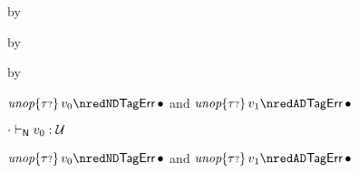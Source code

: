 {\begin{lamportproof*}
    \begin{pfproof}
      \absurdstep
        \begin{pfproof}
          by 
        \end{pfproof}
    \end{pfproof}

    \begin{pfproof}
      \absurdstep
        \begin{pfproof}
          by 
        \end{pfproof}
    \end{pfproof}

    \begin{pfproof}
      \absurdstep
        \begin{pfproof}
          by 
        \end{pfproof}
    \end{pfproof}

    \begin{pfproof}
      \qedstep
        \begin{pfproof}
          {$\eunopt{\stoptional}{\svalue_0} \nredND \tagerrorD$}
          and 
          {$\eunopt{\stoptional}{\svalue_1} \nredAD \tagerrorD$}
        \end{pfproof}
    \end{pfproof}

    \begin{pfproof}
      \absurdstep
        \begin{pfproof}
          ${\cdot} \vdash_{\mathsf{N}} v_0 : {\mathcal U}$
        \end{pfproof}
    \end{pfproof}

    \begin{pfproof}
      \qedstep
        \begin{pfproof}
          {$\eunopt{\stoptional}{\svalue_0} \nredND \tagerrorD$}
          and 
          {$\eunopt{\stoptional}{\svalue_1} \nredAD \tagerrorD$}
        \end{pfproof}
    \end{pfproof}


\end{lamportproof*}}
